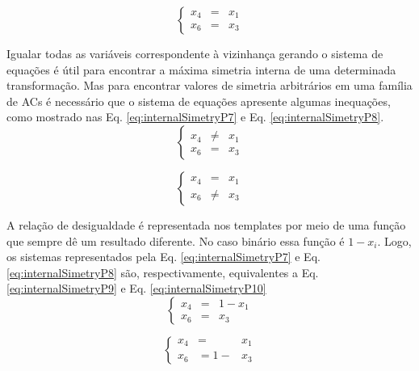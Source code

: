 \begin{equation}
\left\{\begin{matrix}
x_4 & = & x_1\\ 
x_6 & = & x_3
\end{matrix}\right.
\label{eq:internalSimetryP6}
\end{equation}

Igualar todas as variáveis correspondente à vizinhança gerando o sistema de equações é útil para encontrar a máxima simetria interna de uma determinada transformação. Mas para encontrar valores de simetria arbitrários em uma família de ACs é necessário que o sistema de equações apresente algumas inequações, como mostrado nas Eq. \eqref{eq:internalSimetryP7} e Eq. \eqref{eq:internalSimetryP8}.
\begin{equation}
\left\{\begin{matrix}
x_4 & \neq & x_1\\ 
x_6 & = & x_3
\end{matrix}\right.
\label{eq:internalSimetryP7}
\end{equation}

\begin{equation}
\left\{\begin{matrix}
x_4 & = & x_1\\ 
x_6 & \neq & x_3
\end{matrix}\right.
\label{eq:internalSimetryP8}
\end{equation}

A relação de desigualdade é representada nos templates por meio de uma função que sempre dê um resultado diferente. No caso binário essa função é $1 - x_i$. Logo, os sistemas representados pela Eq. \eqref{eq:internalSimetryP7} e Eq. \eqref{eq:internalSimetryP8} são, respectivamente, equivalentes a Eq. \eqref{eq:internalSimetryP9} e Eq. \eqref{eq:internalSimetryP10}
\begin{equation}
\left\{\begin{matrix}
x_4 & = & 1 - x_1\\ 
x_6 & = & x_3
\end{matrix}\right.
\label{eq:internalSimetryP9}
\end{equation}

\begin{equation}
\left\{\begin{matrix}
x_4 & = & x_1\\ 
x_6 & = 1 - & x_3
\end{matrix}\right.
\label{eq:internalSimetryP10}
\end{equation}

